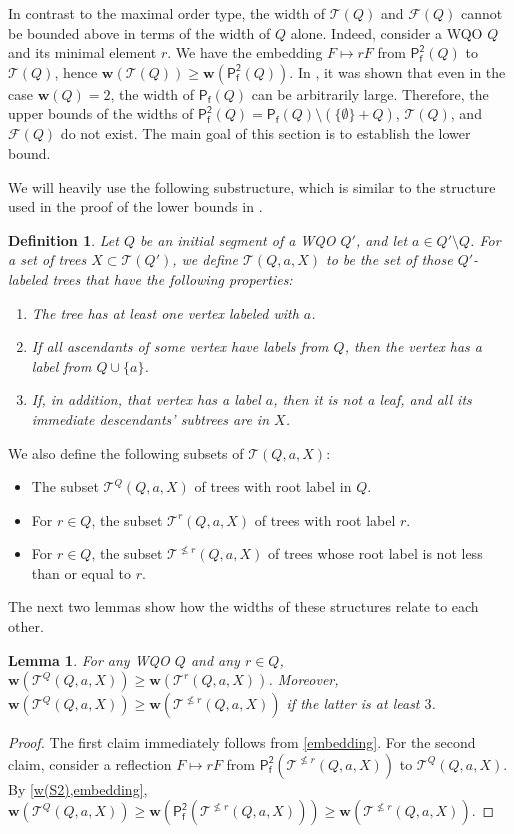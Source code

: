 \documentclass[runningheads]{llncs}
\let \nleq \nleqslant
\let \geq \geqslant
\renewcommand \S [1][]{\mathsf{P_f^{#1}}}
\def \T {\mathcal{T}}
\def \F {\mathcal{F}}
\def \w {\textbf{w}}
\newtheorem{lemma}{Lemma}
\newtheorem{definition}{Definition}
\begin{document}
In contrast to the maximal order type, the width of $\T(Q)$ and $\F(Q)$ cannot be bounded above in terms of the width of $Q$ alone. Indeed, consider a WQO $Q$ and its minimal element $r$. We have the embedding $F \mapsto rF$ from $\S[2](Q)$ to $\T(Q)$, hence $\w(\T(Q)) \geq \w(\S[2](Q))$. In \cite[example 3.7]{Abriola2023}, it was shown that even in the case $\w(Q) = 2$, the width of $\S(Q)$ can be arbitrarily large. Therefore, the upper bounds of the widths of $\S[2](Q) = \S(Q) \setminus (\{\emptyset\} + Q)$, $\T(Q)$, and $\F(Q)$ do not exist. The main goal of this section is to establish the lower bound.

We will heavily use the following substructure, which is similar to the structure used in the proof of the lower bounds in \cite{Selivanov2025}.
\begin{definition}\label{w rec tree}
    Let $Q$ be an initial segment of a WQO $Q'$, and let $a \in Q' \setminus Q$. For a set of trees $X \subset \T(Q')$, we define $\T(Q, a, X)$ to be the set of those $Q'$-labeled trees that have the following properties:
    \begin{enumerate}
        \item The tree has at least one vertex labeled with $a$.
        \item If all ascendants of some vertex have labels from $Q$, then the vertex has a label from $Q \cup \{a\}$.
        \item If, in addition, that vertex has a label $a$, then it is not a leaf, and all its immediate descendants' subtrees are in $X$.
    \end{enumerate}
\end{definition}

We also define the following subsets of $\T(Q, a, X)$:
\begin{itemize}
    \item The subset $\T^Q(Q, a, X)$ of trees with root label in $Q$.
    \item For $r \in Q$, the subset $\T^r(Q, a, X)$ of trees with root label $r$.
    \item For $r \in Q$, the subset $\T^{\nleq r}(Q, a, X)$ of trees whose root label is not less than or equal to $r$.
\end{itemize}

The next two lemmas show how the widths of these structures relate to each other.

\begin{lemma}\label{restrict the root}
    For any WQO $Q$ and any $r \in Q$, $\w(\T^Q(Q, a, X)) \geq \w(\T^r(Q, a, X))$. Moreover, $\w(\T^Q(Q, a, X)) \geq \w(\T^{\nleq r}(Q, a, X))$ if the latter is at least $3$.
\end{lemma}
\begin{proof}
    The first claim immediately follows from \cref{embedding}. For the second claim, consider a reflection $F \mapsto rF$ from $\S[2](\T^{\nleq r}(Q, a, X))$ to $\T^Q(Q, a, X)$. By \cref{w(S2),embedding}, $\w(\T^Q(Q, a, X)) \geq \w(\S[2](\T^{\nleq r}(Q, a, X))) \geq \w(\T^{\nleq r}(Q, a, X))$.
\end{proof}
\end{document}
